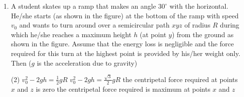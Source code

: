 
\begin{enumerate}
    \item A student skates up a ramp that makes an angle \(30^\circ\) with the horizontal. He/she starts (as shown in the figure) at the bottom of the ramp with speed \(v_0\) and wants to turn around over a semicircular path \(xyz\) of radius \(R\) during which he/she reaches a maximum height \(h\) (at point \(y\)) from the ground as shown in the figure. Assume that the energy loss is negligible and the force required for this turn at the highest point is provided by his/her weight only. Then (\(g\) is the acceleration due to gravity)
        \begin{tasks}(2)
            \task \(v_0^2 - 2gh = \frac{1}{2}gR\)
            \task \(v_0^2 - 2gh = \frac{\sqrt{3}}{2}gR\)
            \task the centripetal force required at points \(x\) and \(z\) is zero
            \task the centripetal force required is maximum at points \(x\) and \(z\)
        \end{tasks}
    \begin{center}
    \end{center}
\end{enumerate}
